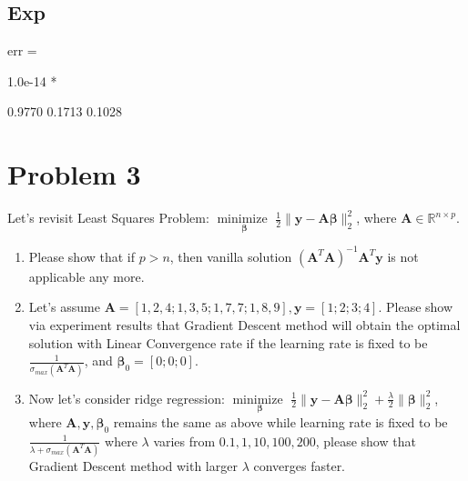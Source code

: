 \documentclass[11pt]{article}
\newcommand{\mfile}[1]  {{\small }} %
\newcommand{\R}{\mathbb{R}}
\newcommand{\minimize}{\operatorname*{minimize\ }}
\newcommand{\mtx}[1]{\mathbf{#1}}
\newcommand{\vct}[1]{\mathbf{#1}}
\def \mA {\mtx{A}}
\def \vy {\vct{y}}
\def \R {\mathbb{R}}
\begin{document}
	\subsection{Exp}
	\mfile{q2.m}
	err =

   1.0e-14 *

    0.9770    0.1713    0.1028

	
	\section{Problem 3}
	Let's revisit Least Squares Problem: $\minimize \limits_{\bm{\beta}} \frac{1}{2}\|\vy-\mA\bm{\beta}\|^2_2$, where $\mA\in\R^{n\times p}$.
	\begin{enumerate}
		\item Please show that if $p>n$, then vanilla solution $(\mA^T\mA)^{-1}\mA^T\vy$ is not applicable any more.	
		\item Let's assume $\mA=[1, 2, 4;1, 3, 5; 1, 7, 7; 1, 8, 9], \vy=[1;2;3;4]$. Please show via experiment results that Gradient Descent method will obtain the optimal solution with  Linear Convergence rate if the learning rate is fixed to be $\frac{1}{\sigma_{max}(\mA^T\mA)}$, and $\bm{\beta}_0=[0;0;0]$.	
		\item Now let's consider ridge regression: $\minimize \limits_{\bm{\beta}} \frac{1}{2}\|\vy-\mA\bm{\beta}\|^2_2+\frac{\lambda}{2} \|\bm{\beta}\|^2_2$, where  $\mA,\vy,\bm{\beta}_0$ remains the same as above while learning rate is fixed to be $\frac{1}{\lambda+\sigma_{max}(\mA^T\mA)}$ where $\lambda$ varies from $0.1,1,10,100,200$, please show that Gradient Descent method with larger $\lambda$ converges faster. 
	\end{enumerate}
\end{document}
